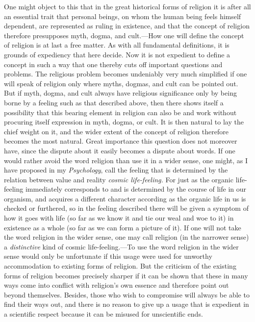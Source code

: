 \documentclass[12pt,a4paper]{book}
\newcommand{\opage}[1]{\marginnote{\footnotesize\textit{[#1]}}}
\begin{document}
One might object to this that in the great historical forms of religion it is
after all an essential trait that personal beings, on whom the human being
feels himself dependent, are represented as ruling in existence, and that the
concept of religion therefore presupposes myth, dogma, and cult.---How one will
define the concept of religion is at last a free matter. As with all
fundamental definitions, it is grounds of expediency that here decide. Now it
is not expedient to define a concept in such a way that one thereby cuts off
important questions and problems. The religious problem becomes undeniably very
much simplified if one will speak of religion only where myths, dogmas, and
cult can be pointed out. But if myth, dogma, and cult always have religious
significance only by being borne by a feeling such as that described above,
then there shows itself a possibility that this bearing element in religion can
also be and work without procuring itself expression in myth, dogma, or cult.
It is then natural to lay the chief weight on it, and the wider extent of the
concept of religion therefore becomes the most natural. Great importance this
question does not moreover have, since the dispute about it easily becomes a
dispute about words. If one would rather avoid the word religion than use it in
a wider sense, one might, as I have proposed in my 
\opage{65}\emph{Psychology}, call the
feeling that is determined by the relation between value and reality
\emph{cosmic life-feeling.} For just as the organic life-feeling immediately
corresponds to and is determined by the course of life in our organism, and
acquires a different character according as the organic life in us is checked or
furthered, so in the feeling described there will be given a symptom of how it
goes with life (so far as we know it and tie our weal and woe to it) in
existence as a whole (so far as we can form a picture of it). If one will not
take the word religion in the wider sense, one may call religion (in the
narrower sense) a \emph{distinctive} kind of cosmic life-feeling.---To use the
word religion in the wider sense would only be unfortunate if this usage were
used for unworthy accommodation to existing forms of religion. But the criticism
of the existing forms of religion becomes precisely sharper if it can be shown
that these in many ways come into conflict with religion's own essence and
therefore point out beyond themselves. Besides, those who wish to compromise
will always be able to find their ways out, and there is no reason to give up a
usage that is expedient in a scientific respect because it can be misused for
unscientific ends.
\end{document}
